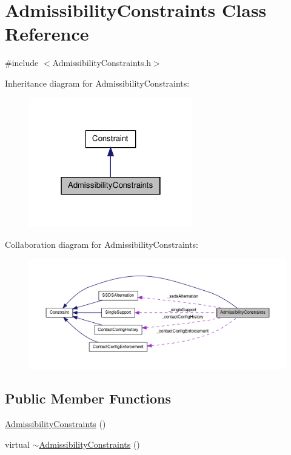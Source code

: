 \hypertarget{classAdmissibilityConstraints}{\section{\-Admissibility\-Constraints \-Class \-Reference}
\label{classAdmissibilityConstraints}
}


{\ttfamily \#include $<$\-Admissibility\-Constraints.\-h$>$}



\-Inheritance diagram for \-Admissibility\-Constraints\-:\nopagebreak
\begin{figure}[H]
\begin{center}
\leavevmode
\includegraphics[width=202pt]{classAdmissibilityConstraints__inherit__graph}
\end{center}
\end{figure}


\-Collaboration diagram for \-Admissibility\-Constraints\-:\nopagebreak
\begin{figure}[H]
\begin{center}
\leavevmode
\includegraphics[width=350pt]{classAdmissibilityConstraints__coll__graph}
\end{center}
\end{figure}
\subsection*{\-Public \-Member \-Functions}
\begin{DoxyCompactItemize}
\item 
\hyperlink{classAdmissibilityConstraints_a43220ed86e4b8b841e24e39fc91628a6}{\-Admissibility\-Constraints} ()
\item 
virtual \hyperlink{classAdmissibilityConstraints_a7daa761292772da2f01084584fc46736}{$\sim$\-Admissibility\-Constraints} ()
\end{DoxyCompactItemize}
